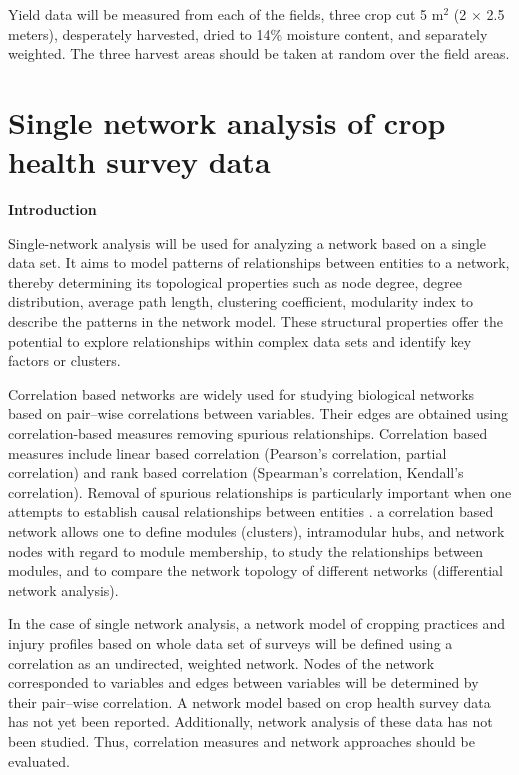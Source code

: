 Yield data will be measured from each of the fields, three crop cut 5 $\mathrm{m}^{2}$ (2 $\times$ 2.5 meters), desperately harvested, dried to 14\% moisture content, and separately weighted. The three harvest areas should be taken at random over the field areas. 

\section*{Single network analysis of crop health survey data}
\textbf{Introduction}


Single-network analysis will be used for analyzing a network based on a single data set. It aims to model patterns of relationships between entities to a network, thereby determining its topological properties such as node degree, degree distribution, average path length, clustering coefficient, modularity index  to describe the patterns in the network model. These structural properties offer the potential to explore relationships within complex data sets and identify key factors or clusters.

Correlation based networks are widely used for studying biological networks based on pair--wise correlations between variables. Their edges are obtained using correlation-based measures removing spurious relationships. Correlation based measures include linear based correlation (Pearson's correlation, partial correlation) and rank based correlation (Spearman's correlation, Kendall's correlation). Removal of spurious relationships is particularly important when one attempts to establish causal relationships between entities . a correlation based network allows one to define modules (clusters), intramodular hubs, and network nodes with regard to module membership, to study the relationships between modules, and to compare the network topology of different networks (differential network analysis). 

In the case of single network analysis, a network model of cropping practices and injury profiles based on whole data set of surveys will be defined using a correlation as an undirected, weighted network. Nodes of the network corresponded to variables and edges between variables will be determined by their pair--wise correlation. A network model based on crop health survey data has not yet been reported. Additionally, network analysis of these data has not been studied. Thus, correlation measures and network approaches should be evaluated.

